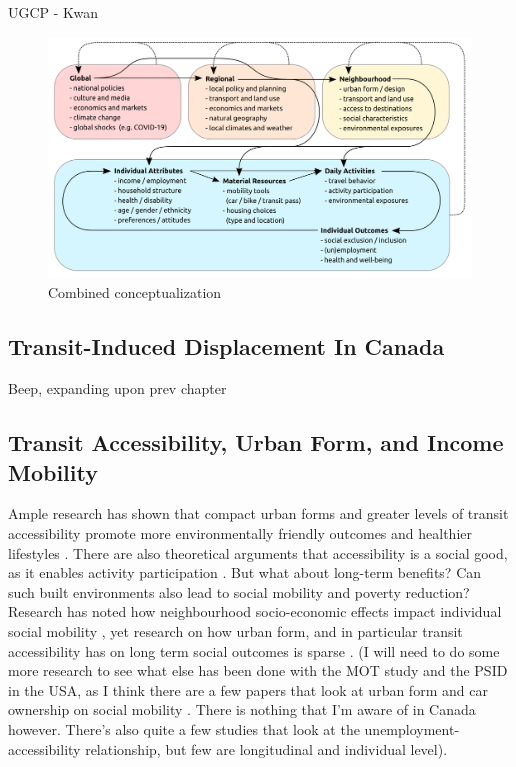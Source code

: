 UGCP - Kwan




\begin{figure}[H]
	\caption{Combined conceptualization}
	\includegraphics[width=7in]{figures/my_idea.png}
	\centering
\end{figure}




\subsection{Transit-Induced Displacement In Canada}

Beep, expanding upon prev chapter




\subsection{Transit Accessibility, Urban Form, and Income Mobility}

Ample research has shown that compact urban forms and greater levels of transit accessibility promote more environmentally friendly outcomes and healthier lifestyles \cite{ewing_compactness_2015,ewing_travel_2010,cervero_travel_1997}. There are also theoretical arguments that accessibility is a social good, as it enables activity participation \cite{martens_transport_2016,pereira_distributive_2017}.
But what about long-term benefits? Can such built environments also lead to social mobility and poverty reduction? Research has noted how neighbourhood socio-economic effects impact individual social mobility \cite{chetty_effects_2016}, yet research on how urban form, and in particular transit accessibility has on long term social outcomes is sparse \cite{ewing_does_2016,fransen_relationship_2019}.
(I will need to do some more research to see what else has been done with the MOT study and the PSID in the USA, as I think there are a few papers that look at urban form and car ownership on social mobility \cite{smart_disentangling_2020}. There is nothing that I'm aware of in Canada however. There's also quite a few studies that look at the unemployment-accessibility relationship, but few are longitudinal and individual level).


